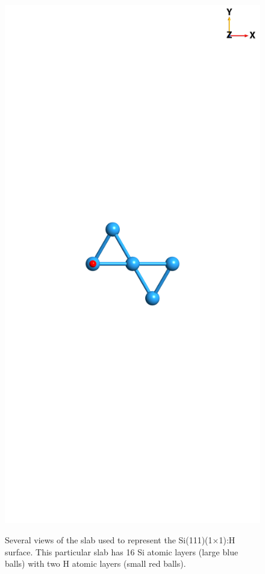 \begin{figure}
\begin{minipage}[b]{0.31\textwidth}
        \label{fig:1x1side}
    \end{minipage}
    \begin{minipage}[b]{0.31\textwidth}
        \centering
        \includegraphics[width=\textwidth]{figures/source/structure/Si1x1-top}
        \label{fig:1x1top}
    \end{minipage}
    \caption{Several views of the slab used to represent the
    Si(111)(1$\times$1):H surface. This particular slab has 16 Si atomic layers
    (large blue balls) with two H atomic layers (small red balls).}
    \label{fig:1x1struc}
\end{figure}

